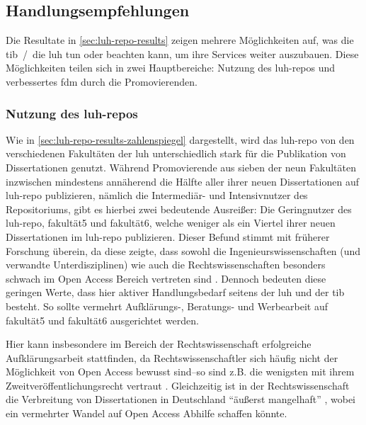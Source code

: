 \subsection{Handlungsempfehlungen}
Die Resultate in \cref{sec:luh-repo-results} zeigen mehrere Möglichkeiten auf, was die \gls{tib}~/~die \gls{luh} tun oder beachten kann, um ihre Services weiter auszubauen.
Diese Möglichkeiten teilen sich in zwei Hauptbereiche: Nutzung des \gls{luh-repo}s und verbessertes \gls{fdm} durch die Promovierenden.

\subsubsection{Nutzung des \gls{luh-repo}s}
Wie in \cref{sec:luh-repo-results-zahlenspiegel} dargestellt, wird das \gls{luh-repo} von den verschiedenen Fakultäten der \gls{luh} unterschiedlich stark für die Publikation von Dissertationen genutzt.
Während Promovierende aus sieben der neun Fakultäten inzwischen mindestens annäherend die Hälfte aller ihrer neuen Dissertationen auf \gls{luh-repo} publizieren, nämlich die Intermediär- und Intensivnutzer des Repositoriums, gibt es hierbei zwei bedeutende Ausreißer:
Die Geringnutzer des \gls{luh-repo}, \gls{fakultät5} und \gls{fakultät6}, welche weniger als ein Viertel ihrer neuen Dissertationen im \gls{luh-repo} publizieren.
Dieser Befund stimmt mit früherer Forschung überein, da diese zeigte, dass sowohl die Ingenieurswissenschaften (und verwandte Unterdisziplinen) wie auch die Rechtswissenschaften besonders schwach im Open Access Bereich vertreten sind \autocite{Archambault2014,Piwowar2018,Severin2020-Jura,Hamann2019-OA,Fischer2022-Jura}.
Dennoch bedeuten diese geringen Werte, dass hier aktiver Handlungsbedarf seitens der \gls{luh} und der \gls{tib} besteht.
So sollte vermehrt Aufklärungs-, Beratungs- und Werbearbeit auf \gls{fakultät5} und \gls{fakultät6} ausgerichtet werden.

Hier kann insbesondere im Bereich der Rechtswissenschaft erfolgreiche Aufklärungsarbeit stattfinden, da Rechtswissenschaftler sich häufig nicht der Möglichkeit von Open Access bewusst sind--so sind z.B. die wenigsten mit ihrem Zweitveröffentlichungsrecht vertraut \autocite[91]{Eisentraut}.
Gleichzeitig ist in der Rechtswissenschaft die Verbreitung von Dissertationen in Deutschland \enquote{äußerst mangelhaft} \autocite[50]{Steinhauer2019-OA}, wobei ein vermehrter Wandel auf Open Access Abhilfe schaffen könnte.

